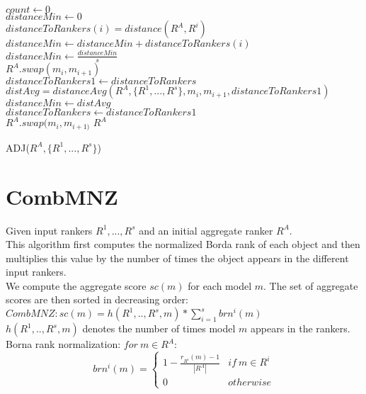\documentclass{article}
\begin{document}
\begin{itemize}
	   \begin{algorithm}[H]
	    $count \leftarrow 0$\\
	    $distanceMin \leftarrow 0$\\
	     {
	   	 $distanceToRankers(i) = distance(R^A, R^i)$\\
	   	 $distanceMin \leftarrow distanceMin + distanceToRankers(i)$
	    }
	    $distanceMin \leftarrow \frac {distanceMin} {s}$\\
	     {
	   	   {
	   	 	$R^A.swap(m_i, m_{i+1})$\\
	   	 	$distanceToRankers1 \leftarrow distanceToRankers$\\
	   	 	$distAvg = distanceAvg(R^A, \{R^1,...,R^s\}, m_i, m_{i+1}, distanceToRankers1)$
	   	  }
	   	   {
	   	 	$distanceMin \leftarrow distAvg$\\
	   	 	$distanceToRankers \leftarrow distanceToRankers1$\\
	   	  }
	   	  \Else  
	   	 	{ $R^A.swap(m_i, m_{i+1)}$} 
	    }
	    \Return $R^A$
	    \caption{ADJ($R^A, \{R^1,...,R^s\}$)}
	   \end{algorithm}
	  	
	  \end{itemize}
	 
	 
	\section{CombMNZ \cite{A}}
		Given input rankers $R^1,...,R^s$ and an initial aggregate ranker $R^A$.\\
	    This algorithm first computes the normalized Borda rank of each object and then multiplies this value by 
	    the number of times the object appears in the different input rankers.\\
	    We compute the aggregate score $sc(m)$ for each model $m$. The set of aggregate scores are then sorted 
	    in decreasing order:\\
	    $CombMNZ: sc(m) = h({R^1, .., R^s}, m) * \sum_{i = 1}^{s}brn^i(m)$\\
	    $h({R^1, .., R^s}, m)$ denotes the number of times model $m$ appears in the rankers.\\	    
	    Borna rank normalization: 
	    $for~ m \in R^A:$
	    \[brn^i(m) =\begin{cases} 
         1 - \frac{r_{R^i}(m) - 1}{|R^A|} & if ~ m \in R^i \\
         0 & otherwise
         \end{cases} \]
         
\end{document}
